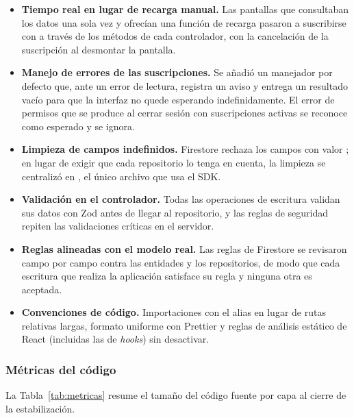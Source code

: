 \begin{itemize}
    \item \textbf{Tiempo real en lugar de recarga manual.} Las pantallas que
    consultaban los datos una sola vez y ofrecían una función de recarga
    pasaron a suscribirse con  a través de los métodos
     de cada controlador, con la cancelación de la
    suscripción al desmontar la pantalla.
    \item \textbf{Manejo de errores de las suscripciones.} Se añadió un
    manejador por defecto que, ante un error de lectura, registra un aviso y
    entrega un resultado vacío para que la interfaz no quede esperando
    indefinidamente. El error de permisos que se produce al cerrar sesión con
    suscripciones activas se reconoce como esperado y se ignora.
    \item \textbf{Limpieza de campos indefinidos.} Firestore rechaza los
    campos con valor ; en lugar de exigir que cada
    repositorio lo tenga en cuenta, la limpieza se centralizó en
    , el único archivo que usa el SDK.
    \item \textbf{Validación en el controlador.} Todas las operaciones de
    escritura validan sus datos con Zod antes de llegar al repositorio, y las
    reglas de seguridad repiten las validaciones críticas en el servidor.
    \item \textbf{Reglas alineadas con el modelo real.} Las reglas de
    Firestore se revisaron campo por campo contra las entidades y los
    repositorios, de modo que cada escritura que realiza la aplicación
    satisface su regla y ninguna otra es aceptada.
    \item \textbf{Convenciones de código.} Importaciones con el alias
     en lugar de rutas relativas largas, formato uniforme con
    Prettier y reglas de análisis estático de React (incluidas las de
    \emph{hooks}) sin desactivar.
\end{itemize}

\subsubsection{Métricas del código}

La Tabla~\ref{tab:metricas} resume el tamaño del código fuente por capa al
cierre de la estabilización.


